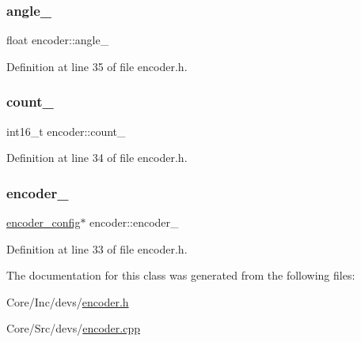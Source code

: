 \subsubsection{\texorpdfstring{angle\_}{angle\_}}
{\footnotesize\ttfamily float encoder\+::angle\+\_\+\hspace{0.3cm}{\ttfamily [private]}}



Definition at line 35 of file encoder.\+h.

\mbox{\label{classencoder_a059f99828d5f0c5333f9d86e581db32d}} 
\subsubsection{\texorpdfstring{count\_}{count\_}}
{\footnotesize\ttfamily int16\+\_\+t encoder\+::count\+\_\+\hspace{0.3cm}{\ttfamily [private]}}



Definition at line 34 of file encoder.\+h.

\mbox{\label{classencoder_aa59894d07cce9165245828c4e00c92e9}} 
\subsubsection{\texorpdfstring{encoder\_}{encoder\_}}
{\footnotesize\ttfamily \mbox{\hyperlink{structencoder__config}{encoder\+\_\+config}}$\ast$ encoder\+::encoder\+\_\+\hspace{0.3cm}{\ttfamily [private]}}



Definition at line 33 of file encoder.\+h.



The documentation for this class was generated from the following files\+:\begin{DoxyCompactItemize}
\item 
Core/\+Inc/devs/\mbox{\hyperlink{encoder_8h}{encoder.\+h}}\item 
Core/\+Src/devs/\mbox{\hyperlink{encoder_8cpp}{encoder.\+cpp}}\end{DoxyCompactItemize}
